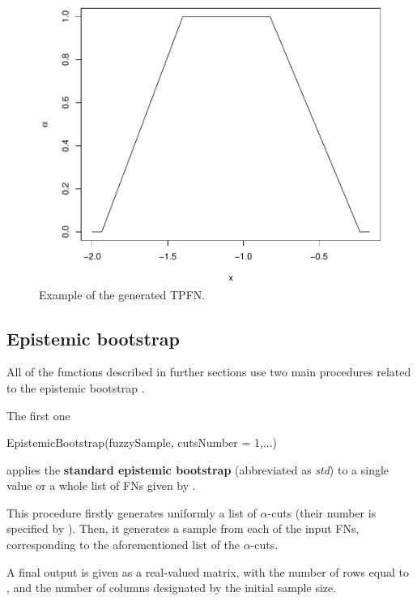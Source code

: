 \begin{figure}[htb]
  \centering
	\includegraphics[scale=0.45]{fuzzy_number_rys1.pdf}
	\caption{Example of the generated TPFN.}
	\label{figFN1}
\end{figure}


\subsection{Epistemic bootstrap}

All of the functions described in further sections use two main procedures related to the epistemic bootstrap \citep{grzegorzewski2021,10.1007/978-3-031-08974-9_39,pgmr2022,PGMR2024AMS}.

The first one

\begin{example}
EpistemicBootstrap(fuzzySample, cutsNumber = 1,...)
\end{example}

applies the \textbf{standard epistemic bootstrap} (abbreviated as \emph{std}) to a single value or a whole list of FNs given by .

This procedure firstly generates uniformly a list of $\alpha$-cuts (their number is specified by ). Then, it generates a sample from each of the input FNs, corresponding to the aforementioned list of the $\alpha$-cuts.

A final output is given as a real-valued matrix, with the number of rows equal to , and the number of columns designated by the initial sample size.

